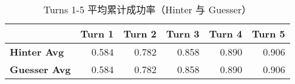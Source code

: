 \begin{table}
\caption{Turns 1-5 平均累计成功率（Hinter 与 Guesser）}
\label{tab:cum_success_overall}
\begin{tabular}{lrrrrr}
\toprule
 & Turn 1 & Turn 2 & Turn 3 & Turn 4 & Turn 5 \\
\midrule
\textbf{Hinter Avg} & 0.584 & 0.782 & 0.858 & 0.890 & 0.906 \\
\textbf{Guesser Avg} & 0.584 & 0.782 & 0.858 & 0.890 & 0.906 \\
\bottomrule
\end{tabular}
\end{table}

